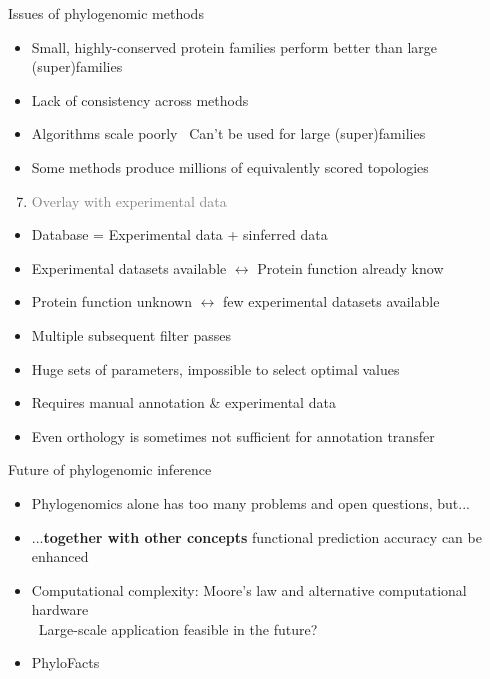 \documentclass[14pt,xcolor=dvipsnames,pdftex]{beamer}
\begin{document}
\begin{frame}[allowframebreaks]{Issues of phylogenomic methods}
\begin{itemize}
  \item Small, highly-conserved protein families perform better than large (super)families
  \item Lack of consistency across methods
  \item Algorithms scale poorly
  \textrightarrow\ Can't be used for large (super)families
  \item Some methods produce millions of equivalently scored topologies
 \end{itemize}
 \framebreak
 \begin{enumerate}
  \setcounter{enumi}{6}
  \item \textcolor{gray}{Overlay with experimental data}
 \end{enumerate}
 \begin{itemize}
  \item Database = Experimental data + sinferred data
  \item Experimental datasets available
        $\leftrightarrow$ Protein function already know
  \item Protein function unknown $\leftrightarrow$ few experimental datasets available
 \end{itemize}
 \framebreak
 \begin{itemize}
  \item Multiple subsequent filter passes
  \item Huge sets of parameters, impossible to select optimal values
  \item Requires manual annotation \& experimental data
  \item Even orthology is sometimes not sufficient for annotation transfer
 \end{itemize}
\end{frame}

\begin{frame}{Future of phylogenomic inference}
 \begin{itemize}
  \item Phylogenomics alone has too many problems and open questions, but...
  \pause
  \item ...\textbf{together with other concepts} functional prediction accuracy can be enhanced
  \item Computational complexity: Moore's law and alternative computational hardware\\
  \textrightarrow\ Large-scale application feasible in the future?
  \item PhyloFacts
 \end{itemize}
\end{frame}
\end{document}

